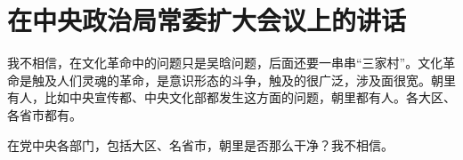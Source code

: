 \section[在中央政治局常委扩大会议上的讲话（一九六六年四月二十二日）]{在中央政治局常委扩大会议上的讲话}


我不相信，在文化革命中的问题只是吴晗问题，后面还要一串串“三家村”。文化革命是触及人们灵魂的革命，是意识形态的斗争，触及的很广泛，涉及面很宽。朝里有人，比如中央宣传都、中央文化部都发生这方面的问题，朝里都有人。各大区、各省市都有。

在党中央各部门，包括大区、名省市，朝里是否那么干净？我不相信。

